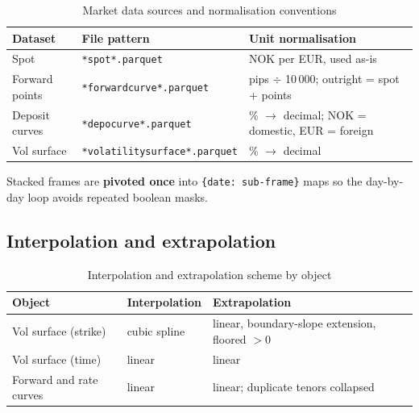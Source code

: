 \documentclass[11pt, a4paper]{article}
\theoremstyle{defstyle}
\newcommand{\code}[1]{\texttt{#1}}
\begin{document}
\begin{table}[h]
\centering
\renewcommand{\arraystretch}{1.3}
\begin{tabular}{@{} l l l @{}}
    \toprule
    \textbf{Dataset}  & \textbf{File pattern}          & \textbf{Unit normalisation} \\
    \midrule
    Spot              & \code{*spot*.parquet}              & NOK per EUR, used as-is \\
    Forward points    & \code{*forwardcurve*.parquet}      & pips $\div$ 10\,000; outright = spot + points \\
    Deposit curves    & \code{*depocurve*.parquet}         & \% $\to$ decimal; NOK = domestic, EUR = foreign \\
    Vol surface       & \code{*volatilitysurface*.parquet} & \% $\to$ decimal \\
    \bottomrule
\end{tabular}
\caption{Market data sources and normalisation conventions}
\end{table}

Stacked frames are \textbf{pivoted once} into \code{\{date: sub-frame\}} maps so the
day-by-day loop avoids repeated boolean masks.

\subsection{Interpolation and extrapolation}

\begin{table}[h]
\centering
\renewcommand{\arraystretch}{1.3}
\begin{tabular}{@{} l l l @{}}
    \toprule
    \textbf{Object}            & \textbf{Interpolation} & \textbf{Extrapolation} \\
    \midrule
    Vol surface (strike)       & cubic spline           & linear, boundary-slope extension, floored $> 0$ \\
    Vol surface (time)         & linear                 & linear \\
    Forward and rate curves    & linear                 & linear; duplicate tenors collapsed \\
    \bottomrule
\end{tabular}
\caption{Interpolation and extrapolation scheme by object}
\end{table}
\end{document}
